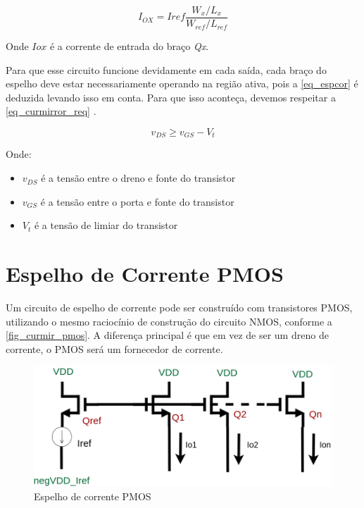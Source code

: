 \begin{equation}
    \label{eq_espcor}
    I_{OX} = Iref\frac{W_x/L_x}{W_{ref}/L_{ref}}
\end{equation}

Onde $I{ox}$ \'e a corrente de entrada do bra{\c c}o \emph{Qx}. 

Para que esse circuito funcione devidamente em cada sa\'ida, cada bra{\c c}o do espelho deve estar necessariamente operando na regi\~ao ativa, pois a \autoref{eq_espcor} \'e deduzida levando isso em conta. Para que isso aconte{\c c}a, devemos respeitar a \autoref{eq_curmirror_req} \cite{RazaviFundM}.

\begin{equation}
    \label{eq_curmirror_req}
    v_{DS} \geq v_{GS} - V_t
\end{equation}

Onde:

\begin{itemize}
    \item $v_{DS}$ \'e a tens\~ao entre o dreno e fonte do transistor
    \item $v_{GS}$ \'e a tens\~ao entre o porta e fonte do transistor
    \item $V_{t}$ \'e a tens\~ao de limiar do transistor
\end{itemize}

\section{Espelho de Corrente PMOS}

Um circuito de espelho de corrente pode ser constru\'ido com transistores PMOS, utilizando o mesmo racioc\'inio de constru{\c c}\~ao do circuito NMOS, conforme a \autoref{fig_curmir_pmos}. A diferen{\c c}a principal \'e que em vez de ser um dreno de corrente, o PMOS ser\'a um fornecedor de corrente.

\begin{figure}[htb]
    \label{fig_curmir_pmos}
    \centering
    \caption{Espelho de corrente PMOS} 
    \includegraphics[scale=0.4]{Circuitos/current_mirror_example_pmos.png}
\end{figure}

